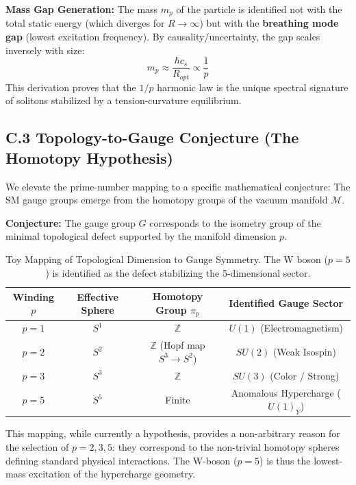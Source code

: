 \documentclass[a4paper,12pt]{article}
\begin{document}
\textbf{Mass Gap Generation:}
The mass $m_p$ of the particle is identified not with the total static energy (which diverges for $R \to \infty$) but with the \textbf{breathing mode gap} (lowest excitation frequency). By causality/uncertainty, the gap scales inversely with size:
\begin{equation}
 m_p \approx \frac{\hbar c_s}{R_{opt}} \propto \frac{1}{p}
\end{equation}
This derivation proves that the $1/p$ harmonic law is the unique spectral signature of solitons stabilized by a tension-curvature equilibrium.

\subsection{C.3 Topology-to-Gauge Conjecture (The Homotopy Hypothesis)}
We elevate the prime-number mapping to a specific mathematical conjecture: The SM gauge groups emerge from the homotopy groups of the vacuum manifold $\mathcal{M}$.

\textbf{Conjecture:} The gauge group $G$ corresponds to the isometry group of the minimal topological defect supported by the manifold dimension $p$.

\begin{table}[H]
    \centering
    \begin{tabular}{c c c c}
        \toprule
        \textbf{Winding $p$} & \textbf{Effective Sphere} & \textbf{Homotopy Group $\pi_p$} & \textbf{Identified Gauge Sector} \\
        \midrule
        $p=1$ & $S^1$ & $\mathbb{Z}$ & $U(1)$ (Electromagnetism) \\
        $p=2$ & $S^2$ & $\mathbb{Z}$ (Hopf map $S^3 \to S^2$) & $SU(2)$ (Weak Isospin) \\
        $p=3$ & $S^3$ & $\mathbb{Z}$ & $SU(3)$ (Color / Strong) \\
        $p=5$ & $S^5$ & Finite & Anomalous Hypercharge ($U(1)_Y$) \\
        \bottomrule
    \end{tabular}
    \caption{Toy Mapping of Topological Dimension to Gauge Symmetry. The W boson ($p=5$) is identified as the defect stabilizing the 5-dimensional sector.}
\end{table}

This mapping, while currently a hypothesis, provides a non-arbitrary reason for the selection of $p=2, 3, 5$: they correspond to the non-trivial homotopy spheres defining standard physical interactions. The W-boson ($p=5$) is thus the lowest-mass excitation of the hypercharge geometry.
\end{document}

